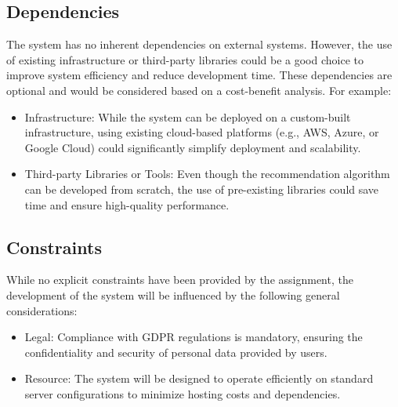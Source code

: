 \subsection{Dependencies}
\label{subsec:dependencies}%
The system has no inherent dependencies on external systems. However, the use of existing infrastructure or third-party libraries could be a good choice to improve system efficiency and reduce development time. These dependencies are optional and would be considered based on a cost-benefit analysis. For example:
\begin{itemize}
    \item Infrastructure: While the system can be deployed on a custom-built infrastructure, using existing cloud-based platforms (e.g., AWS, Azure, or Google Cloud) could significantly simplify deployment and scalability.
    \item Third-party Libraries or Tools: Even though the recommendation algorithm can be developed from scratch, the use of pre-existing libraries could save time and ensure high-quality performance.
\end{itemize}

\subsection{Constraints}
\label{subsec:constraints}%
While no explicit constraints have been provided by the assignment, the development of the system will be influenced by the following general considerations:
\begin{itemize}
    \item Legal: Compliance with GDPR regulations is mandatory, ensuring the confidentiality and security of personal data provided by users.
    \item Resource: The system will be designed to operate efficiently on standard server configurations to minimize hosting costs and dependencies.
\end{itemize}